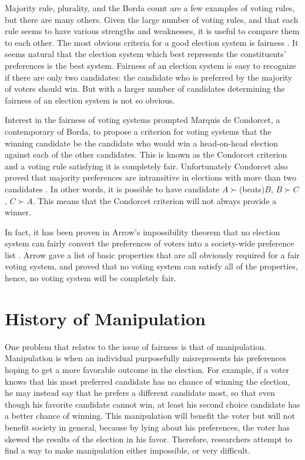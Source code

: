 	Majority rule, plurality, and the Borda count are a few examples of voting rules, but there are many others. Given the large number of voting rules, and that each rule seems to have various strengths and weaknesses, it is useful to compare them to each other. The most obvious criteria for a good election system is fairness \cite{chevaleyre2006issues}. It seems natural that the election system which best represents the constituents' preferences is the best system. Fairness of an election system is easy to recognize if there are only two candidates: the candidate who is preferred by the majority of voters should win. But with a larger number of candidates determining the fairness of an election system is not so obvious.

	Interest in the fairness of voting systems prompted Marquis de Condorcet, a contemporary of Borda, to propose a criterion for voting systems that the winning candidate be the candidate who would win a head-on-head election against each of the other candidates. This is known as the Condorcet criterion and a voting rule satisfying it is completely fair. Unfortunately Condorcet also proved that majority preferences are intransitive in elections with more than two candidates \cite{le1785essai, black1998theory}. In other words, it is possible to have candidate $A \succ $(beats)$ B$, $B \succ C$, $C \succ A$. This means that the Condorcet criterion will not always provide a winner.

	In fact, it has been proven in Arrow's impossibility theorem that no election system can fairly convert the preferences of voters into a society-wide preference list \cite{arrow1950difficulty}. Arrow gave a list of basic properties that are all obviously required for a fair voting system, and proved that no voting system can satisfy all of the properties, hence, no voting system will be completely fair.


\section{History of Manipulation}

	One problem that relates to the issue of fairness is that of manipulation. Manipulation is when an individual purposefully misrepresents his preferences hoping to get a more favorable outcome in the election. For example, if a voter knows that his most preferred candidate has no chance of winning the election, he may instead say that he prefers a different candidate most, so that even though his favorite candidate cannot win, at least his second choice candidate has a better chance of winning. This manipulation will benefit the voter but will not benefit society in general, because by lying about his preferences, the voter has skewed the results of the election in his favor. Therefore, researchers attempt to find a way to make manipulation either impossible, or very difficult.

